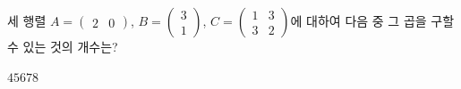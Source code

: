 \hspace*{2mm}\begin{minipage}[t]{\dimexpr\linewidth-2mm\relax}\vspace{0pt}
세 행렬 $A=\begin{pmatrix} 2 & 0 \end{pmatrix}$, $B=\begin{pmatrix} 3 \\ 1 \end{pmatrix}$, $C=\begin{pmatrix} 1 & 3 \\ 3 & 2 \end{pmatrix}$에 대하여 다음 중 그 곱을 구할 수 있는 것의 개수는? 
\begin{choices32}{$4$}{$5$}{$6$}{$7$}{$8$}\end{choices32}\end{minipage}
